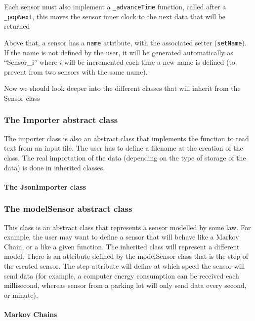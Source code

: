 Each sensor must also implement a \verb!_advanceTime! function, called after a
\verb!_popNext!, this moves the sensor inner clock to the next data that will
be returned

Above that, a sensor has a \verb!name! attribute, with the associated setter
(\verb!setName!). If the name is not defined by the user, it will be generated
automatically as ``Sensor\_i'' where $i$ will be incremented each time a new
name is defined (to prevent from two sensors with the same name).

Now we should look deeper into the different classes that will inherit from the
Sensor class

\subsubsection{The Importer abstract class}

The importer class is also an abstract class that implements the function
to read text from an input file. The user has to define a filename at the
creation of the class. The real importation of the data (depending on the type
of storage of the data) is done in inherited classes.

\paragraph{The JsonImporter class}



\subsubsection{The modelSensor abstract class}

This class is an abstract class that represents a sensor modelled by some
law. For example, the user may want to define a sensor that will behave like a
Markov Chain, or a like a given function. The inherited class will represent a
different model. There is an attribute defined by the modelSensor class that is
the step of the created sensor. The step attribute will define at which speed
the sensor will send data (for example, a computer energy consumption can be
received each millisecond, whereas sensor from a parking lot will only send
data every second, or minute).

\paragraph{Markov Chains}

